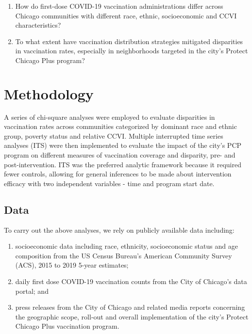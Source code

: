 \documentclass[
]{article}
\begin{document}
\begin{enumerate}
\def\labelenumi{(\arabic{enumi})}
\item
  How do first-dose COVID-19 vaccination administrations differ across Chicago communities with different race, ethnic, socioeconomic and CCVI characteristics?
\item
  To what extent have vaccination distribution strategies mitigated disparities in vaccination rates, especially in neighborhoods targeted in the city's Protect Chicago Plus program?
\end{enumerate}

\hypertarget{methodology}{%
\section{Methodology}\label{methodology}}

A series of chi-square analyses were employed to evaluate disparities in vaccination rates across communities categorized by dominant race and ethnic group, poverty status and relative CCVI. Multiple interrupted time series analyses (ITS) were then implemented to evaluate the impact of the city's PCP program on different measures of vaccination coverage and disparity, pre- and post-intervention. ITS was the preferred analytic framework because it required fewer controls, allowing for general inferences to be made about intervention efficacy with two independent variables - time and program start date.

\hypertarget{data}{%
\subsection{Data}\label{data}}

To carry out the above analyses, we rely on publicly available data including:

\begin{enumerate}
\def\labelenumi{(\arabic{enumi})}
\item
  socioeconomic data including race, ethnicity, socioeconomic status and age composition from the US Census Bureau's American Community Survey (ACS), 2015 to 2019 5-year estimates;
\item
  daily first dose COVID-19 vaccination counts from the City of Chicago's data portal; and
\item
  press releases from the City of Chicago and related media reports concerning the geographic scope, roll-out and overall implementation of the city's Protect Chicago Plus vaccination program.
\end{enumerate}
\end{document}
